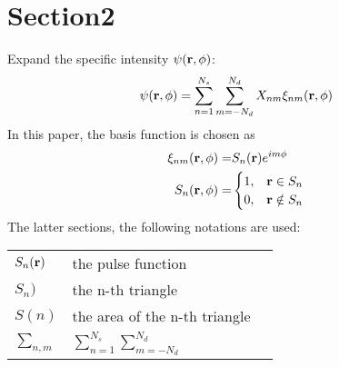 \documentclass[main]{subfiles}
\begin{document}
\section{Section2}
\label{sec:Section2}
Expand the specific intensity $\psi(\mathbf{r},\phi)$:
\begin{equation*}
	\psi(\mathbf{r},\phi)=\sum\limits_{n=1}^{N_s}\sum\limits_{m=-N_d}^{N_d}
	X_{nm}\xi_{nm}(\mathbf{r},\phi)
\end{equation*}
In this paper, the basis function is chosen as
\begin{align*}
	\xi_{nm}(\mathbf{r},\phi) =& S_n(\mathbf{r})e^{i m \phi}		\\ 
	S_n(\mathbf{r},\phi) =& \begin{cases}
		1, & \mathbf{r}\in S_n \\
		0, & \mathbf{r}\notin S_n
	\end{cases}
\end{align*}
The latter sections, the following notations are used:
\begin{center} \begin{tabular}{lll}
	$S_n(\mathbf{r})$	&	the pulse function		\\
	$S_n)$		&	the n-th triangle		\\
	$S(n)$		&	the area of the n-th triangle	\\
	$\sum\nolimits_{n,m}$	&
	$\sum\nolimits_{n=1}^{N_s}\sum\nolimits_{m=-N_d}^{N_d}$	\\
\end{tabular} \end{center}

\end{document}
